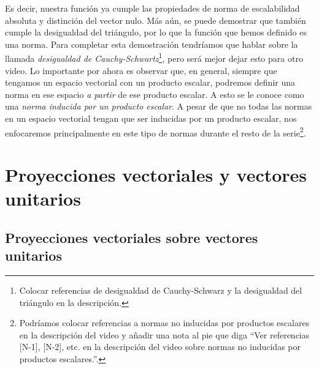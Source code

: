 \documentclass[12pt,dvipsnames]{article}
\numberwithin{equation}{section}
\begin{document}
\noindent Es decir, nuestra función ya cumple las propiedades de norma de escalabilidad absoluta y distinción del vector nulo. Más aún, se puede demostrar que también cumple la desigualdad del triángulo, por lo que la función que hemos definido es una norma. Para completar esta demostración tendríamos que hablar sobre la llamada \emph{desigualdad de Cauchy-Schwartz}\footnote{Colocar referencias de desigualdad de Cauchy-Schwarz y la desigualdad del triángulo en la descripción.}, pero será mejor dejar esto para otro video. Lo importante por ahora es observar que, en general, siempre que tengamos un espacio vectorial con un producto escalar, podremos definir una norma en ese espacio \emph{a partir} de ese producto escalar. A esto se le conoce como una \emph{norma inducida por un producto escalar}. A pesar de que no todas las normas en un espacio vectorial tengan que ser inducidas por un producto escalar, nos enfocaremos principalmente en este tipo de normas durante el resto de la serie\footnote{Podríamos colocar referencias a normas no inducidas por productos escalares en la descripción del video y añadir una nota al pie que diga ``Ver referencias [N-1], [N-2], etc. en la descripción del video sobre normas no inducidas por productos escalares.''.}.


\section{Proyecciones vectoriales y vectores unitarios}

\subsection{Proyecciones vectoriales sobre vectores unitarios}
\end{document}

